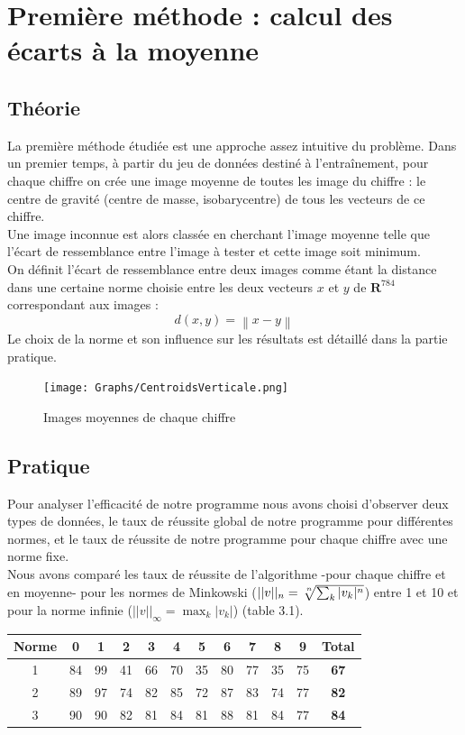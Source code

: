 \documentclass[a4paper,11pt,twoside]{report}
\newcommand{\norm}[1]{\left\lVert#1\right\rVert} %
\begin{document}
\chapter{Première méthode : calcul des écarts à la moyenne} 
\section{Théorie}
La première méthode étudiée est une approche assez intuitive du problème.
Dans un premier temps, à partir du jeu de données destiné à l'entraînement, pour chaque chiffre on crée une image moyenne de toutes les image du chiffre : le centre de gravité (centre de masse, isobarycentre) de tous les vecteurs de ce chiffre.\\Une image inconnue est alors classée en cherchant l'image moyenne telle que l'écart de ressemblance entre l'image à tester et cette image soit minimum.\\

On définit l'écart de ressemblance entre deux images comme étant la distance dans une certaine norme choisie entre les deux vecteurs $x$ et $y$ de $\textbf{R}^{784}$ correspondant aux images : $$d(x,y) = \norm{x-y}$$ Le choix de la norme et son influence sur les résultats est détaillé dans la partie pratique.

\begin{figure}[H]
  	\texttt{[image: Graphs/CentroidsVerticale.png]}
  	\caption{Images moyennes de chaque chiffre}
\end{figure}

\section{Pratique}
Pour analyser l'efficacité de notre programme nous avons choisi d'observer deux types de données, le taux de réussite global de notre programme pour différentes normes, et le taux de réussite de notre programme pour chaque chiffre avec une norme fixe.
\\
Nous avons comparé les taux de réussite de l'algorithme -pour chaque chiffre et en moyenne- pour les normes de Minkowski ($||v||_{n} = \sqrt[\leftroot{-2}\uproot{2} n]{\sum_{k}^{} |v_{k}|^n}$) entre 1 et 10 et pour la norme infinie ($||v||_{\infty} = \displaystyle \max_{k}|v_{k}|$) (table 3.1).

\begin{center}
\begin{tabular}{ |c||c|c|c|c|c|c|c|c|c|c|c| } 
\hline
 Norme & 0 & 1 & 2 & 3 & 4 & 5 & 6 & 7 & 8 & 9 & \textbf{Total} \\ 
  \hline
  \hline
 1 & 84 & 99 & 41 & 66 & 70 & 35 & 80 & 77 & 35 & 75 & \textbf{67}\\
 \hline
 2 & 89 & 97 & 74 & 82 & 85 & 72 & 87 & 83 & 74 & 77 & \textbf{82}\\
 \hline
 3 & 90 & 90 & 82 & 81 & 84 & 81 & 88 & 81 & 84 & 77 & \textbf{84}\\
 \hline
\end{tabular}
\end{center}
\end{document}
